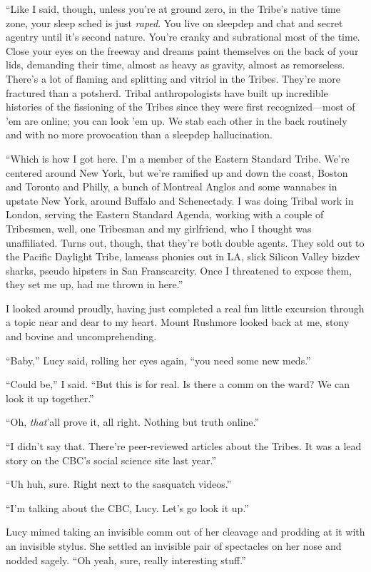 “Like I said, though, unless you’re at ground zero, in the Tribe’s
native time zone, your sleep sched is just \emph{raped}. You live
on sleepdep and chat and secret agentry until it’s second nature.
You’re cranky and subrational most of the time. Close your eyes on
the freeway and dreams paint themselves on the back of your lids,
demanding their time, almost as heavy as gravity, almost as
remorseless. There’s a lot of flaming and splitting and vitriol in
the Tribes. They’re more fractured than a potsherd. Tribal
anthropologists have built up incredible histories of the
fissioning of the Tribes since they were first recognized—most of
’em are online; you can look ’em up. We stab each other in the back
routinely and with no more provocation than a sleepdep
hallucination.

“Which is how I got here. I’m a member of the Eastern Standard
Tribe. We’re centered around New York, but we’re ramified up and
down the coast, Boston and Toronto and Philly, a bunch of Montreal
Anglos and some wannabes in upstate New York, around Buffalo and
Schenectady. I was doing Tribal work in London, serving the Eastern
Standard Agenda, working with a couple of Tribesmen, well, one
Tribesman and my girlfriend, who I thought was unaffiliated. Turns
out, though, that they’re both double agents. They sold out to the
Pacific Daylight Tribe, lameass phonies out in LA, slick Silicon
Valley bizdev sharks, pseudo hipsters in San Franscarcity. Once I
threatened to expose them, they set me up, had me thrown in here.”

I looked around proudly, having just completed a real fun little
excursion through a topic near and dear to my heart. Mount Rushmore
looked back at me, stony and bovine and uncomprehending.

“Baby,” Lucy said, rolling her eyes again, “you need some new
meds.”

“Could be,” I said. “But this is for real. Is there a comm on the
ward? We can look it up together.”

“Oh, \emph{that}’all prove it, all right. Nothing but truth
online.”

“I didn’t say that. There’re peer-reviewed articles about the
Tribes. It was a lead story on the CBC’s social science site last
year.”

“Uh huh, sure. Right next to the sasquatch videos.”

“I’m talking about the CBC, Lucy. Let’s go look it up.”

Lucy mimed taking an invisible comm out of her cleavage and
prodding at it with an invisible stylus. She settled an invisible
pair of spectacles on her nose and nodded sagely. “Oh yeah, sure,
really interesting stuff.”

